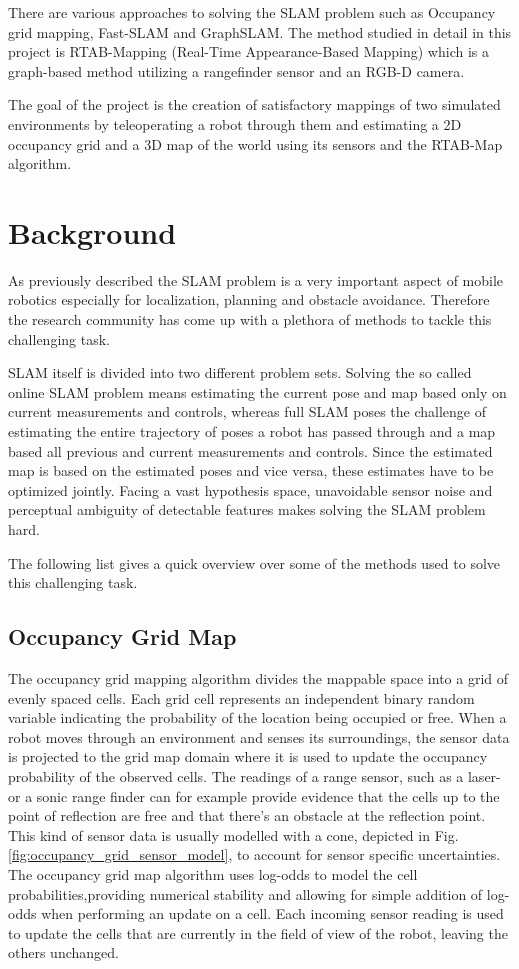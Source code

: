 \documentclass[10pt,journal,compsoc]{IEEEtran}
\begin{document}
There are various approaches to solving the SLAM problem such as Occupancy grid mapping, Fast-SLAM and GraphSLAM. The method studied in detail in this project is RTAB-Mapping (Real-Time Appearance-Based Mapping) which is a graph-based method utilizing a rangefinder sensor and an RGB-D camera.

The goal of the project is the creation of satisfactory mappings of two simulated environments by teleoperating a robot through them and estimating a 2D occupancy grid and a 3D map of the world using its sensors and the RTAB-Map algorithm.


\section{Background}

As previously described the SLAM problem is a very important aspect of mobile robotics especially for localization, planning and obstacle avoidance. Therefore the research community has come up with a plethora of methods to tackle this challenging task.

SLAM itself is divided into two different problem sets. Solving the so called online SLAM problem means estimating the current pose and map based only on current measurements and controls, whereas full SLAM poses the challenge of estimating the entire trajectory of poses a robot has passed through and a map based all previous and current measurements and controls.
Since the estimated map is based on the estimated poses and vice versa, these estimates have to be optimized jointly. Facing a vast hypothesis space, unavoidable sensor noise and perceptual ambiguity of detectable features makes solving the SLAM problem hard.

The following list gives a quick overview over some of the methods used to solve this challenging task.

\subsection{Occupancy Grid Map}

The occupancy grid mapping algorithm divides the mappable space into a grid of evenly spaced cells. Each grid cell represents an independent binary random variable indicating the probability of the location being occupied or free. When a robot moves through an environment and senses its surroundings, the sensor data is projected to the grid map domain where it is used to update the occupancy probability of the observed cells. The readings of a range sensor, such as a laser- or a sonic range finder can for example provide evidence that the cells up to the point of reflection are free and that there's an obstacle at the reflection point. This kind of sensor data is usually modelled with a cone, depicted in Fig.\ref{fig:occupancy_grid_sensor_model}, to account for sensor specific uncertainties.
The occupancy grid map algorithm uses log-odds to model the cell probabilities,providing numerical stability and allowing for simple addition of log-odds when performing an update on a cell. Each incoming sensor reading is used to update the cells that are currently in the field of view of the robot, leaving the others unchanged.
\end{document}
